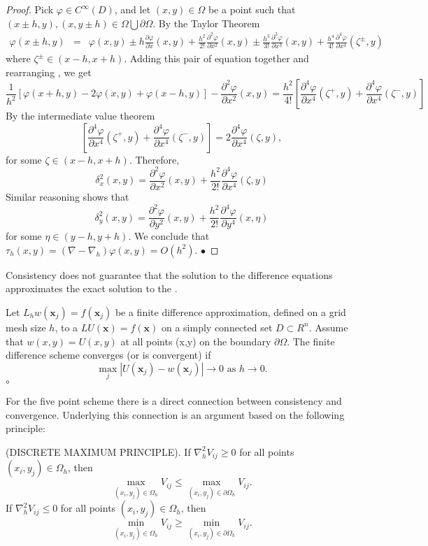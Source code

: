 \begin{proof}
Pick $\varphi \in C^{\infty}(D)$, and let $(x,y) \in \Omega$ be a point such that $(x\pm h, y),(x,y \pm h) \in \Omega\bigcup \partial\Omega$.  By the Taylor Theorem
\begin{eqnarray*}
\varphi(x\pm h,y)&=&\varphi(x,y) \pm h \frac{\partial \varphi}{\partial x}(x,y)+\frac{h^2}{2!}\frac{\partial^2 \varphi}{\partial x^2}(x,y) \pm\frac{h^3}{3!}\frac{\partial^3 \varphi}{\partial x^3}(x,y)+\frac{h^4}{4!}\frac{\partial^4 \varphi}{\partial x^4}(\zeta^{\pm},y)
\end{eqnarray*}
where $\zeta^{\pm} \in (x-h,x+h)$. Adding this pair of equation together and rearranging , we get
\[\frac{1}{h^2}[\varphi(x+h,y)-2\varphi(x,y)+\varphi(x-h,y) ] -\frac{\partial^2 \varphi}{\partial x^2}(x,y)=\frac{h^2}{4!}\left[\frac{\partial^4 \varphi}{\partial x^4}(\zeta^{+},y)+
\frac{\partial^4 \varphi}{\partial x^4}(\zeta^{-},y)
 \right]
\]
By the intermediate value theorem
\[\left[\frac{\partial^4 \varphi}{\partial x^4}(\zeta^{+},y)+
\frac{\partial^4 \varphi}{\partial x^4}(\zeta^{-},y)
 \right]
=2\frac{\partial^4 \varphi}{\partial x^4}(\zeta,y),\]
for some $\zeta \in (x-h,x+h)$.  Therefore,
\[\delta_x^2(x,y)
=\frac{\partial^2 \varphi}{\partial x^2}(x,y)+\frac{h^2}{2!}\frac{\partial^4 \varphi}{\partial x^4}(\zeta,y)
\]
Similar reasoning shows that
\[\delta_y^2(x,y)
=\frac{\partial^2 \varphi}{\partial y^2}(x,y)+\frac{h^2}{2!}\frac{\partial^4 \varphi}{\partial y^4}(x,\eta)
\]
for some $\eta \in (y-h,y+h)$. We conclude that $\tau_h(x,y)=(\nabla-\nabla_h)\varphi(x,y)=O(h^2).$
$\bullet$\end{proof}
Consistency does not guarantee that the solution to the difference equations approximates the exact solution to the . 
\begin{definition}
Let $L_hw(\mathbf{x}_j)=f(\mathbf{x}_j)$ be a finite difference approximation, defined on a grid mesh size $h$, to a  $LU(\mathbf{x})=f(\mathbf{x})$ on a simply
connected set $D \subset R^n$. Assume that $w(x,y)=U(x,y)$ at all points (x,y) on the boundary $\partial\Omega$.  The finite difference scheme converges (or is convergent) if
\[ \max_j|U(\mathbf{x}_j)-w(\mathbf{x}_j)| \rightarrow 0 \mbox{  as  } h \rightarrow 0.\]
$\circ$
\end{definition}
For the five point scheme there is a direct connection between consistency and convergence.  Underlying this connection is an argument based on the following principle:
\begin{theorem}
(DISCRETE MAXIMUM PRINCIPLE).
If $\nabla^2_hV_{ij}\geq 0$ for all points $(x_i,y_j) \in \Omega_h$, then
\[ \max_{(x_i,y_j)\in\Omega_h}V_{ij}\leq  \max_{(x_i,y_j)\in\partial\Omega_h}V_{ij}.\]
If $\nabla^2_hV_{ij}\leq 0$ for all points $(x_i,y_j) \in \Omega_h$, then
\[ \min_{(x_i,y_j)\in\Omega_h}V_{ij}\geq  \min_{(x_i,y_j)\in\partial\Omega_h}V_{ij}.\]
\end{theorem}
